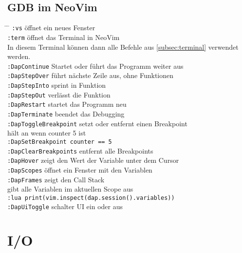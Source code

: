 \documentclass[a4paper,12pt,twoside]{article}
\begin{document}
\subsection{GDB im NeoVim}
\begin{tabbing}
	\hspace{5mm} \= \hspace{50mm} \= \kill
	\> \verb|:vs| \> öffnet ein neues Fenster \\
	\> \verb|:term| \> öffnet das Terminal in NeoVim \\
	\> \hspace{2mm}In diesem Terminal können dann alle Befehle aus \ref{subsec:terminal} verwendet werden. \\
	\> \verb|:DapContinue| \> Startet oder führt das Programm weiter aus \\
	\> \verb|:DapStepOver| \> führt nächste Zeile aus, ohne Funktionen \\
	\> \verb|:DapStepInto| \> sprint in Funktion \\
	\> \verb|:DapStepOut| \> verlässt die Funktion \\
	\> \verb|:DapRestart| \> startet das Programm neu \\
	\> \verb|:DapTerminate| \> beendet das Debugging \\
	\> \verb|:DapToggleBreakpoint| \> setzt oder entfernt einen Breakpoint \\
	\> \hspace{2mm}hält an wenn counter 5 ist \\
	\> \verb|:DapSetBreakpoint counter == 5| \\
	\> \verb|:DapClearBreakpoints| \> entfernt alle Breakpoints \\
	\> \verb|:DapHover| \> zeigt den Wert der Variable unter dem Cursor \\
	\> \verb|:DapScopes| \> öffnet ein Fenster mit den Variablen \\
	\> \verb|:DapFrames| \> zeigt den Call Stack \\
	\> \hspace{2mm}gibt alle Variablen im aktuellen Scope aus \\
	\> \verb|:lua print(vim.inspect(dap.session().variables))| \\
	\> \verb|:DapUiToggle| \> schalter UI ein oder aus \\
\end{tabbing}
\section{I/O}
\end{document}
